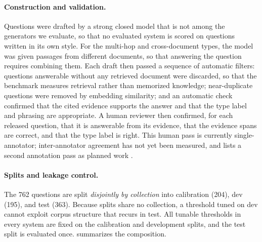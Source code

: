 \documentclass[10pt,twocolumn]{article}
\begin{document}
\paragraph{Construction and validation.}
Questions were drafted by a strong closed model that is not among the generators
we evaluate, so that no evaluated system is scored on questions written in its own
style. For the multi-hop and cross-document types, the model was given passages
from different documents, so that answering the question requires combining them.
Each draft then passed a sequence of automatic filters: questions answerable
without any retrieved document were discarded, so that the benchmark measures
retrieval rather than memorized knowledge; near-duplicate questions were removed
by embedding similarity; and an automatic check confirmed that the cited evidence
supports the answer and that the type label and phrasing are appropriate. A human
reviewer then confirmed, for each released question, that it is answerable from
its evidence, that the evidence spans are correct, and that the type label is
right. This human pass is currently single-annotator; inter-annotator agreement
has not yet been measured, and  lists a second annotation pass as
planned work \cite{gebru2021datasheets}.

\paragraph{Splits and leakage control.}
The 762 questions are split \emph{disjointly by collection} into calibration
(204), dev (195), and test (363). Because splits share no collection, a
threshold tuned on dev cannot exploit corpus structure that recurs in test. All
tunable thresholds in every system are fixed on the calibration and development
splits, and the test split is evaluated once.  summarizes
the composition.
\end{document}
